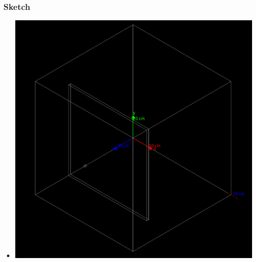 \documentclass[aspectratio-169]{beamer}
\begin{document}

\begin{frame}
\frametitle{Sketch}
\begin{itemize}
    \item 
    \begin{minipage}{0.65\textwidth}
        \includegraphics[width=\textwidth]{vis.png}
    \end{minipage}
\end{itemize}
\end{frame}

\end{document}
